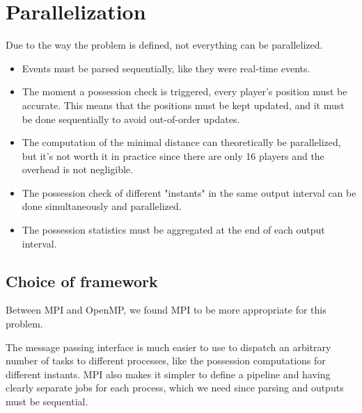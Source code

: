 \documentclass[a4paper]{article}
\begin{document}
%

\section{Parallelization}

Due to the way the problem is defined, not everything can be parallelized.

\begin{itemize}
	\item Events must be parsed sequentially, like they were real-time events.
\item The moment a possession check is triggered, every player's position must be accurate. This means that the positions must be kept updated, and it must be done sequentially to avoid out-of-order updates.
\item The computation of the minimal distance can theoretically be parallelized, but it's not worth it in practice since there are only 16 players and the overhead is not negligible.
\item The possession check of different "instants" in the same output interval can be done simultaneously and parallelized.
\item The possession statistics must be aggregated at the end of each output interval.
\end{itemize}

\subsection{Choice of framework}
Between MPI and OpenMP, we found MPI to be more appropriate for this problem.

The message passing interface is much easier to use to dispatch an arbitrary number of tasks to different processes, like the possession computations for different instants. MPI also makes it simpler to define a pipeline and having clearly separate jobs for each process, which we need since parsing and outputs must be sequential.
\end{document}
